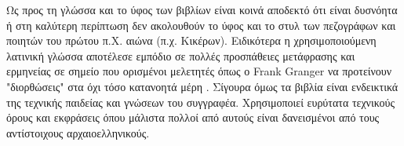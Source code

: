 Ως προς τη γλώσσα και το ύφος των βιβλίων είναι κοινά αποδεκτό ότι είναι δυσνόητα ή στη καλύτερη περίπτωση δεν ακολουθούν το ύφος και το στυλ των πεζογράφων και ποιητών του πρώτου π.Χ. αιώνα (π.χ. Κικέρων). Ειδικότερα η χρησιμοποιούμενη λατινική γλώσσα αποτέλεσε εμπόδιο σε πολλές προσπάθειες μετάφρασης και ερμηνείας σε σημείο που ορισμένοι μελετητές όπως ο Frank Granger να προτείνουν "διορθώσεις" στα όχι τόσο κατανοητά μέρη  \cite[σ. 19]{vitruvius-lefas}. Σίγουρα όμως τα βιβλία είναι ενδεικτικά της τεχνικής παιδείας και γνώσεων του συγγραφέα. Χρησιμοποιεί ευρύτατα τεχνικούς όρους και εκφράσεις όπου μάλιστα πολλοί από αυτούς είναι δανεισμένοι από τους αντίστοιχους αρχαιοελληνικούς.









